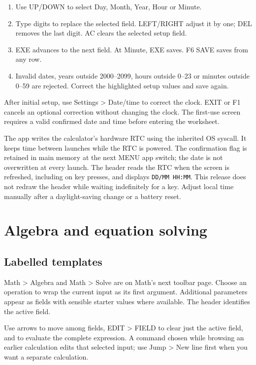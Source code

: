 \documentclass[11pt,a4paper]{article}
\newcommand{\key}[1]{\textsf{\fbox{\strut\scriptsize #1}}}
\newcommand{\menu}[1]{\textsf{\color{teal}#1}}
\begin{document}
\begin{enumerate}
\item Use UP/DOWN to select Day, Month, Year, Hour or Minute.
\item Type digits to replace the selected field. LEFT/RIGHT adjust it by one; DEL removes the last digit. AC clears the selected setup field.
\item EXE advances to the next field. At Minute, EXE saves. F6 SAVE saves from any row.
\item Invalid dates, years outside 2000--2099, hours outside 0--23 or minutes outside 0--59 are rejected. Correct the highlighted setup values and save again.
\end{enumerate}
After initial setup, use Settings > Date/time to correct the clock. EXIT or F1 cancels an optional correction without changing the clock. The first-use screen requires a valid confirmed date and time before entering the worksheet.

The app writes the calculator's hardware RTC using the inherited OS syscall. It keeps time between launches while the RTC is powered. The confirmation flag is retained in main memory at the next MENU app switch; the date is not overwritten at every launch. The header reads the RTC when the screen is refreshed, including on key presses, and displays \texttt{DD/MM HH:MM}. This release does not redraw the header while waiting indefinitely for a key. Adjust local time manually after a daylight-saving change or a battery reset.
\clearpage

\section{Algebra and equation solving}
\subsection{Labelled templates}
\menu{Math > Algebra} and \menu{Math > Solve} are on Math's next toolbar page. Choose an operation to wrap the current input as its first argument. Additional parameters appear as fields with sensible starter values where available. The header identifies the active field.

Use arrows to move among fields, \menu{EDIT > FIELD} to clear just the active field, and \key{EXE} to evaluate the complete expression. A command chosen while browsing an earlier calculation edits that selected input; use \menu{Jump > New line} first when you want a separate calculation.
\end{document}
